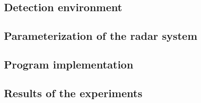 \subsection{Detection environment }


\subsection{Parameterization of the radar system}


\subsection{Program implementation}



\subsection{Results of the experiments}

